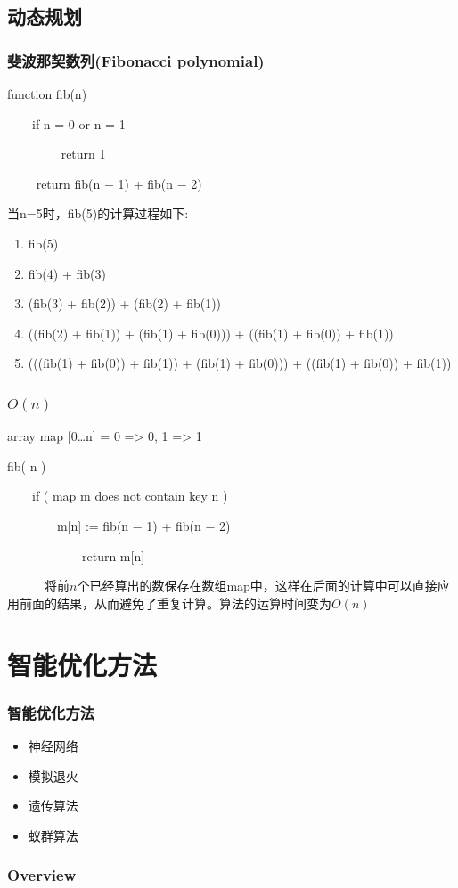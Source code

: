 \documentclass[slidestop,compress,mathserif,c]{beamer}
\begin{document}
\subsection{\hfill 动态规划}
\begin{frame}
  \frametitle{斐波那契数列(Fibonacci polynomial)}
  function fib(n)

~~~~if n = 0 or n = 1

~~~~~~~~ return 1

~~~~    return fib(n − 1) + fib(n − 2)

当n=5时，fib(5)的计算过程如下:
\begin{enumerate}
\item fib(5)
\item fib(4) + fib(3)
\item (fib(3) + fib(2)) + (fib(2) + fib(1))
\item ((fib(2) + fib(1)) + (fib(1) + fib(0))) + ((fib(1) + fib(0)) + fib(1))
\item (((fib(1) + fib(0)) + fib(1)) + (fib(1) + fib(0))) + ((fib(1) + fib(0)) + fib(1))
\end{enumerate}
\end{frame}

\begin{frame}
  \frametitle{$O(n)$}
array map [0\ldots n] = { 0 => 0, 1 => 1  }

fib( n  )

~~~~if ( map m does not contain key n )

~~~~~~~~m[n] := fib(n − 1) + fib(n − 2)

~~~~~~~~~~~~return m[n]

~~~~~~将前$n$个已经算出的数保存在数组map中，这样在后面的计算中可以直接应用前面的结果，从而避免了重复计算。算法的运算时间变为$O(n)$
\end{frame}

\section{智能优化方法}

\begin{frame}
  \frametitle{智能优化方法}
  \begin{itemize}
      \item 神经网络
      \item 模拟退火
      \item 遗传算法
      \item 蚁群算法
  \end{itemize}

\end{frame}


\begin{frame}
\frametitle{Overview}


\end{frame}
\end{document}
